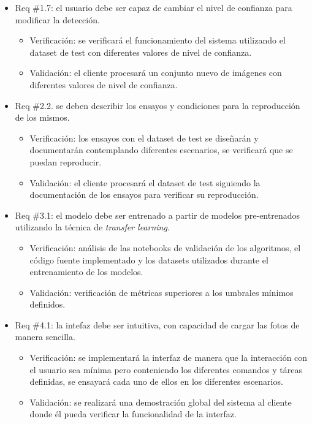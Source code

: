 \documentclass[
11pt %
]{charter}
\begin{document}
\begin{itemize}
\item Req \#1.7: el usuario debe ser capaz de cambiar el nivel de confianza para modificar la detección.
	\begin{itemize}
	\item Verificación: se verificará el funcionamiento del sistema utilizando el dataset de test con diferentes valores de nivel de confianza.
	\item Validación: el cliente procesará un conjunto nuevo de imágenes con diferentes valores de nivel de confianza.
	\end{itemize}

\item Req \#2.2. se deben describir los ensayos y condiciones para la reproducción de los mismos.
	\begin{itemize}
	\item Verificación: los ensayos con el dataset de test se diseñarán y documentarán contemplando diferentes escenarios, se verificará que se puedan reproducir.
	\item Validación: el cliente procesará el dataset de test siguiendo la documentación de los ensayos para verificar su reproducción.
	\end{itemize}

\item Req \#3.1: el modelo debe ser entrenado a partir de modelos pre-entrenados utilizando la técnica de \textit{transfer learning}.
	\begin{itemize}
	\item Verificación: análisis de las notebooks de validación de los algoritmos, el código fuente implementado y los datasets utilizados durante el entrenamiento de los modelos.
	\item Validación: verificación de métricas superiores a los umbrales mínimos definidos.
	\end{itemize}

\item Req \#4.1: la intefaz debe ser intuitiva, con capacidad de cargar las fotos de manera sencilla.
	\begin{itemize}
	\item Verificación: se implementará la interfaz de manera que la interacción con el usuario sea mínima pero conteniendo los diferentes comandos y táreas definidas, se ensayará cada uno de ellos en los diferentes escenarios.
	\item Validación: se realizará una demostración global del sistema al cliente donde él pueda verificar la funcionalidad de la interfaz. 
	\end{itemize}
\end{itemize}
\end{document}
